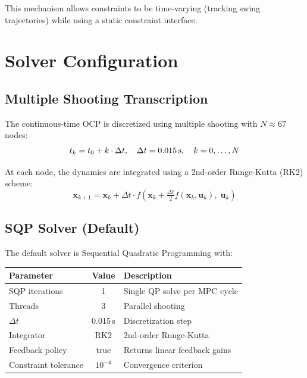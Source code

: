\documentclass[11pt,a4paper]{article}
\begin{document}
This mechanism allows constraints to be time-varying (tracking swing trajectories) while using a static constraint interface.


\section{Solver Configuration}
\label{sec:solver}

\subsection{Multiple Shooting Transcription}

The continuous-time OCP is discretized using multiple shooting with $N \approx 67$ nodes:
\begin{equation}
	t_k = t_0 + k \cdot \Delta t, \quad \Delta t = 0.015\text{\,s}, \quad k = 0, \ldots, N
\end{equation}

At each node, the dynamics are integrated using a 2nd-order Runge-Kutta (RK2) scheme:
\begin{equation}
	\bm{x}_{k+1} = \bm{x}_k + \Delta t \cdot f\!\left(\bm{x}_k + \tfrac{\Delta t}{2} f(\bm{x}_k, \bm{u}_k),\; \bm{u}_k\right)
\end{equation}

\subsection{SQP Solver (Default)}

The default solver is Sequential Quadratic Programming with:
\begin{center}
	\begin{tabular}{lcl}
		\toprule
		Parameter            & Value     & Description                   \\
		\midrule
		SQP iterations       & 1         & Single QP solve per MPC cycle \\
		Threads              & 3         & Parallel shooting             \\
		$\Delta t$           & 0.015\,s  & Discretization step           \\
		Integrator           & RK2       & 2nd-order Runge-Kutta         \\
		Feedback policy      & true      & Returns linear feedback gains \\
		Constraint tolerance & $10^{-4}$ & Convergence criterion         \\
		\bottomrule
	\end{tabular}
\end{center}
\end{document}
